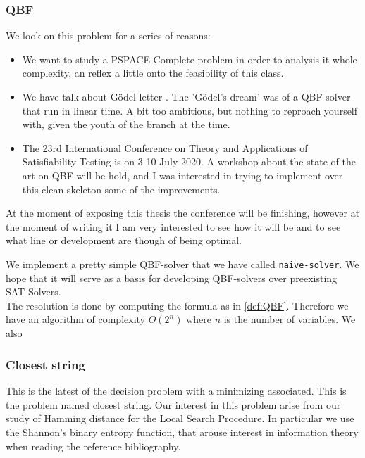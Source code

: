 \subsubsection{QBF}
We look on this problem for a series of reasons:
\begin{itemize}
\item We want to study a PSPACE-Complete problem in order to analysis it whole complexity, an reflex a little onto the feasibility of this class.
\item We have talk about Gödel letter \cite{hartmanis1993godel}. The 'Gödel's dream' was of a QBF solver that run in linear time. A bit too ambitious, but nothing to reproach yourself with, given the youth of the branch at the time.
\item The 23rd International Conference on Theory and Applications of Satisfiability Testing is on  3-10 July 2020. A workshop about the state of the art on QBF will be hold, and I was interested in trying to implement over this clean skeleton some of the improvements. \\
\end{itemize}

  At the moment of exposing this thesis the conference will be finishing, however at the moment of writing it I am very interested to see how it will be and to see what line or development are though of being optimal.


We implement a pretty simple QBF-solver that we have called \texttt{naive-solver}. We hope that it will serve as a basis for developing QBF-solvers over preexisting SAT-Solvers.\\

The resolution is done by computing the formula as in \ref{def:QBF}. Therefore we have an algorithm of complexity $O(2^n)$ where $n$ is the number of variables. We also

\subsubsection{Closest string}

This is the latest of the decision problem with a minimizing associated. This is the problem named closest string. Our interest in this problem arise from our study of Hamming distance for the Local Search Procedure. In particular we use the Shannon’s binary entropy function, that arouse interest in information theory when reading the reference bibliography. \\

